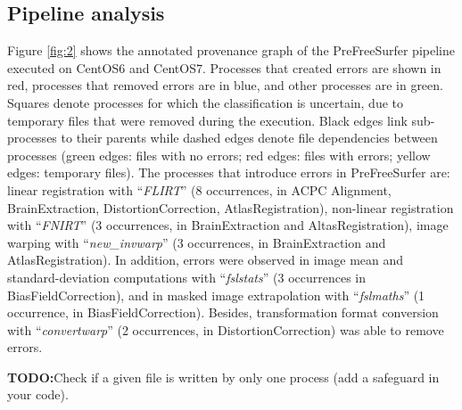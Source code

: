\documentclass{article}
\newcommand{\todo}[1]{\color{red}\textbf{TODO:}#1\color{black}}
\begin{document}
\subsection{Pipeline analysis}

Figure \ref{fig:2} shows the annotated provenance graph of the
PreFreeSurfer pipeline executed on CentOS6 and CentOS7.  Processes
that created errors are shown in red, processes that removed errors
are in blue, and other processes are in green.  Squares denote
processes for which the classification is uncertain, due to temporary
files that were removed during the execution. Black edges link
sub-processes to their parents while dashed edges denote file
dependencies between processes (green edges: files with no errors; red
edges: files with errors; yellow edges: temporary files).  The
processes that introduce errors in PreFreeSurfer are: linear
registration with “\emph{FLIRT}” (8 occurrences, in ACPC Alignment,
BrainExtraction, DistortionCorrection, AtlasRegistration), non-linear
registration with “\emph{FNIRT}” (3 occurrences, in BrainExtraction
and AltasRegistration), image warping with “\emph{new\_invwarp}” (3
occurrences, in BrainExtraction and AtlasRegistration).  In addition,
errors were observed in image mean and standard-deviation computations
with “\emph{fslstats}” (3 occurrences in BiasFieldCorrection), and in
masked image extrapolation with “\emph{fslmaths}” (1 occurrence, in
BiasFieldCorrection).  Besides, transformation format conversion with
“\emph{convertwarp}” (2 occurrences, in DistortionCorrection) was able
to remove errors.

\todo{Check if a given file is written by only one process (add a safeguard in your code).}
\end{document}
